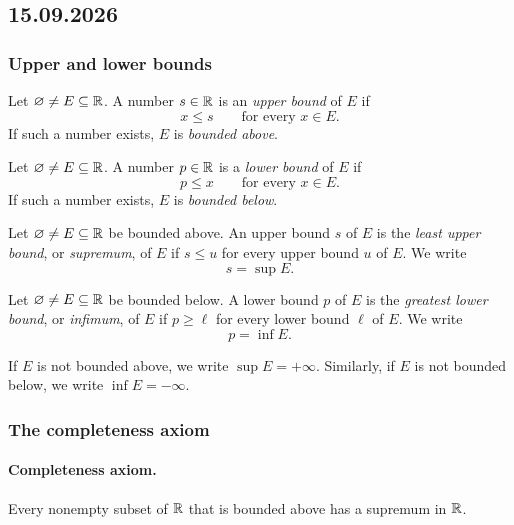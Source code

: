 \documentclass[11pt,a4paper]{amsart}
\begin{document}
\subsection{15.09.2026}

\subsubsection{Upper and lower bounds}

\begin{definition}
  Let \(\varnothing\neq E\subseteq\mathbb{R}\). A number \(s\in\mathbb{R}\) is an
  \emph{upper bound} of \(E\) if
  \[
    x\leq s \qquad\text{for every }x\in E.
  \]
  If such a number exists, \(E\) is \emph{bounded above}.
\end{definition}

\begin{definition}
  Let \(\varnothing\neq E\subseteq\mathbb{R}\). A number \(p\in\mathbb{R}\) is a
  \emph{lower bound} of \(E\) if
  \[
    p\leq x \qquad\text{for every }x\in E.
  \]
  If such a number exists, \(E\) is \emph{bounded below}.
\end{definition}

\begin{definition}
  Let \(\varnothing\neq E\subseteq\mathbb{R}\) be bounded above. An upper bound
  \(s\) of \(E\) is the \emph{least upper bound}, or \emph{supremum}, of
  \(E\) if \(s\leq u\) for every upper bound \(u\) of \(E\). We write
  \[
    s=\sup E.
  \]
\end{definition}

\begin{definition}
  Let \(\varnothing\neq E\subseteq\mathbb{R}\) be bounded below. A lower bound
  \(p\) of \(E\) is the \emph{greatest lower bound}, or \emph{infimum}, of
  \(E\) if \(p\geq\ell\) for every lower bound \(\ell\) of \(E\). We write
  \[
    p=\inf E.
  \]
\end{definition}

If \(E\) is not bounded above, we write \(\sup E=+\infty\). Similarly,
if \(E\) is not bounded below, we write \(\inf E=-\infty\).

\subsubsection{The completeness axiom}

\paragraph{Completeness axiom.}
Every nonempty subset of \(\mathbb{R}\) that is bounded above has a supremum
in \(\mathbb{R}\).
\end{document}
